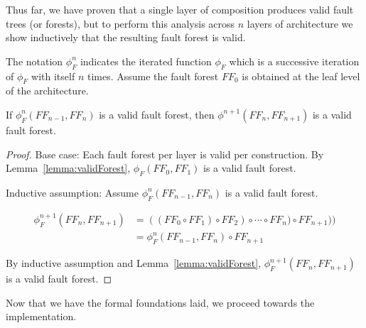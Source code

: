 Thus far, we have proven that a single layer of composition produces valid fault trees (or forests), but to perform this analysis across $n$ layers of architecture we show inductively that the resulting fault forest is valid. 

The notation $\phi_F^n$ indicates the iterated function $\phi_F$ which is a successive iteration of $\phi_F$ with itself $n$ times. Assume the fault forest $\mathit{FF}_0$ is obtained at the leaf level of the architecture.

\begin{theorem} If $\phi_F^n(\mathit{FF}_{n-1}, \mathit{FF}_n)$ is a valid fault forest, then $\phi^{n+1}(\mathit{FF}_{n}, \mathit{FF}_{n+1})$ is a valid fault forest.
\begin{proof}

Base case: Each fault forest per layer is valid per construction. By Lemma~\ref{lemma:validForest}, $\phi_F(\mathit{FF}_{0}, \mathit{FF}_1)$ is a valid fault forest.

Inductive assumption: Assume $\phi_F^n(\mathit{FF}_{n-1}, \mathit{FF}_n)$ is a valid fault forest.

\begin{equation*}
\begin{split}
\phi_F^{n+1}(\mathit{FF}_{n}, \mathit{FF}_{n+1}) &= ((\mathit{FF}_0 \circ \mathit{FF}_1) \circ \mathit{FF}_2) \circ \cdots \circ \mathit{FF}_n) \circ \mathit{FF}_{n+1})) \\
  &= \phi_F^n(\mathit{FF}_{n-1}, \mathit{FF}_n) \circ \mathit{FF}_{n+1}
\end{split}
\end{equation*}


By inductive assumption and Lemma~\ref{lemma:validForest}, $\phi_F^{n+1}(\mathit{FF}_{n}, \mathit{FF}_{n+1})$ is a valid fault forest.

\end{proof}
\label{thm:indForest}
\end{theorem}

Now that we have the formal foundations laid, we proceed towards the implementation. 





